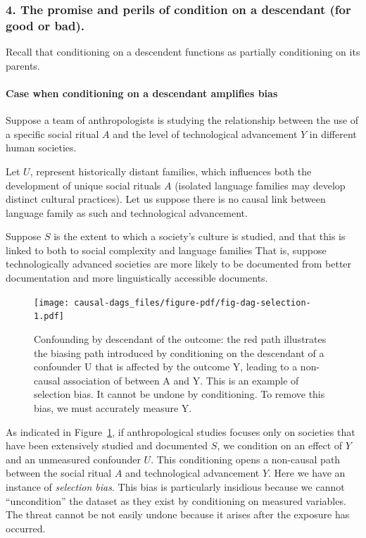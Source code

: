 \documentclass[
  singlecolumn,
  9pt]{article}
\let\oldparagraph\paragraph
\renewcommand{\paragraph}[1]{\oldparagraph{#1}\mbox{}}
\begin{document}
\subsubsection{4. The promise and perils of condition on a descendant
(for good or
bad).}\label{the-promise-and-perils-of-condition-on-a-descendant-for-good-or-bad.}

Recall that conditioning on a descendent functions as partially
conditioning on its parents.

\paragraph{Case when conditioning on a descendant amplifies
bias}\label{case-when-conditioning-on-a-descendant-amplifies-bias}

Suppose a team of anthropologists is studying the relationship between
the use of a specific social ritual \(A\) and the level of technological
advancement \(Y\) in different human societies.

Let \(U\), represent historically distant families, which influences
both the development of unique social rituals \(A\) (isolated language
families may develop distinct cultural practices). Let us suppose there
is no causal link between language family as such and technological
advancement.

Suppose \(S\) is the extent to which a society's culture is studied, and
that this is linked to both to social complexity and language families
That is, suppose technologically advanced societies are more likely to
be documented from better documentation and more linguistically
accessible documents.

\begin{figure}

{\centering \texttt{[image: causal-dags\_files/figure-pdf/fig-dag-selection-1.pdf]}

}

\caption{\label{fig-dag-selection}Confounding by descendant of the
outcome: the red path illustrates the biasing path introduced by
conditioning on the descendant of a confounder U that is affected by the
outcome Y, leading to a non-causal association of between A and Y. This
is an example of selection bias. It cannot be undone by conditioning. To
remove this bias, we must accurately measure Y.}

\end{figure}

As indicated in Figure~\ref{fig-dag-selection}, if anthropological
studies focuses only on societies that have been extensively studied and
documented \(S\), we condition on an effect of \(Y\) and an unmeasured
confounder \(U\). This conditioning opens a non-causal path between the
social ritual \(A\) and technological advancement \(Y\). Here we have an
instance of \emph{selection bias}. This bias is particularly insidious
because we cannot ``uncondition'' the dataset as they exist by
conditioning on measured variables. The threat cannot be not easily
undone because it arises after the exposure has occurred.
\end{document}
